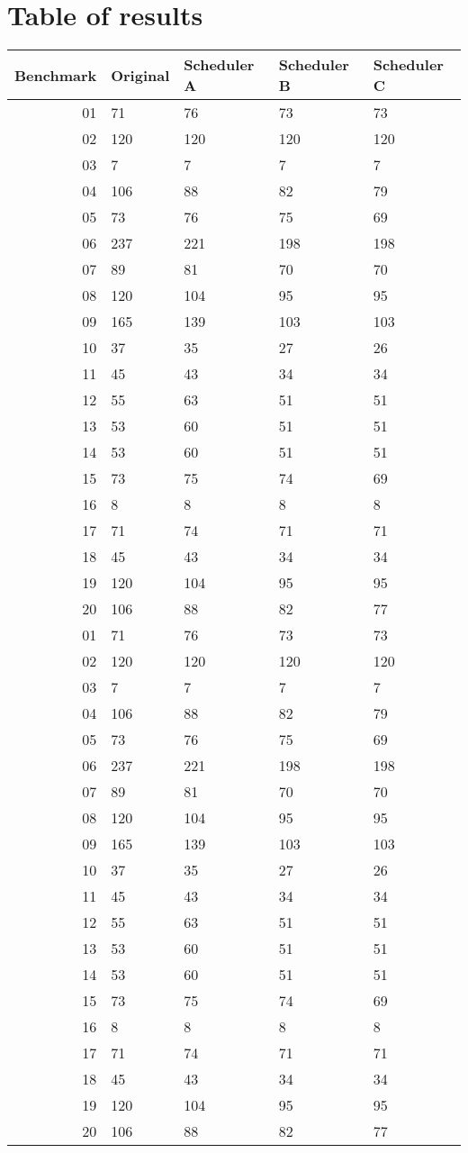 \documentclass{article}
\begin{document}
\section{Table of results}

\begin{center}
\begin{tabular}{r|llll}
Benchmark & Original & Scheduler A & Scheduler B & Scheduler C \\ \hline
01 & 71 & 76 & 73 & 73 \\
02 & 120 & 120 & 120 & 120 \\
03 & 7 & 7 & 7 & 7 \\
04 & 106 & 88 & 82 & 79 \\
05 & 73 & 76 & 75 & 69 \\
06 & 237 & 221 & 198 & 198 \\
07 & 89 & 81 & 70 & 70 \\
08 & 120 & 104 & 95 & 95 \\
09 & 165 & 139 & 103 & 103 \\
10 & 37 & 35 & 27 & 26 \\
11 & 45 & 43 & 34 & 34 \\
12 & 55 & 63 & 51 & 51 \\
13 & 53 & 60 & 51 & 51 \\
14 & 53 & 60 & 51 & 51 \\
15 & 73 & 75 & 74 & 69 \\
16 & 8 & 8 & 8 & 8 \\
17 & 71 & 74 & 71 & 71 \\
18 & 45 & 43 & 34 & 34 \\
19 & 120 & 104 & 95 & 95 \\
20 & 106 & 88 & 82 & 77 \\
01 & 71 & 76 & 73 & 73 \\
02 & 120 & 120 & 120 & 120 \\
03 & 7 & 7 & 7 & 7 \\
04 & 106 & 88 & 82 & 79 \\
05 & 73 & 76 & 75 & 69 \\
06 & 237 & 221 & 198 & 198 \\
07 & 89 & 81 & 70 & 70 \\
08 & 120 & 104 & 95 & 95 \\
09 & 165 & 139 & 103 & 103 \\
10 & 37 & 35 & 27 & 26 \\
11 & 45 & 43 & 34 & 34 \\
12 & 55 & 63 & 51 & 51 \\
13 & 53 & 60 & 51 & 51 \\
14 & 53 & 60 & 51 & 51 \\
15 & 73 & 75 & 74 & 69 \\
16 & 8 & 8 & 8 & 8 \\
17 & 71 & 74 & 71 & 71 \\
18 & 45 & 43 & 34 & 34 \\
19 & 120 & 104 & 95 & 95 \\
20 & 106 & 88 & 82 & 77
\end{tabular}
\end{center}
\end{document}
